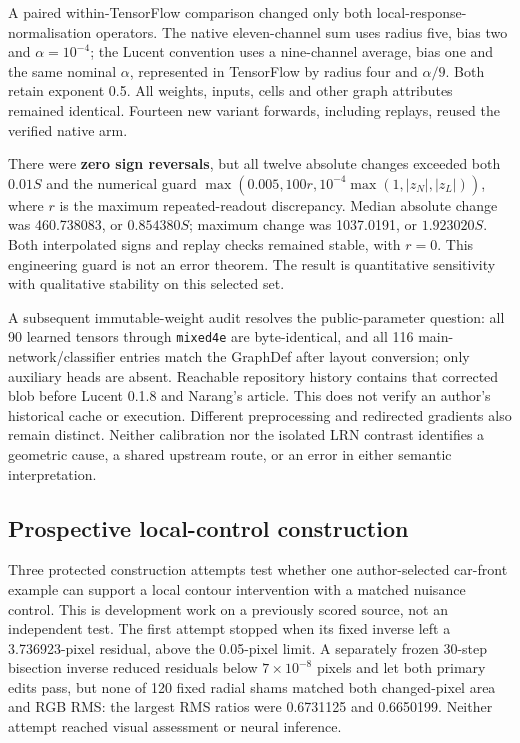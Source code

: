 \documentclass[
  british,
  11pt,
  a4paper,
]{article}
\newcounter{none} %
\begin{document}
A paired within-TensorFlow comparison changed only both
local-response-normalisation operators. The native eleven-channel sum
uses radius five, bias two and \(\alpha=10^{-4}\); the Lucent convention
uses a nine-channel average, bias one and the same nominal \(\alpha\),
represented in TensorFlow by radius four and \(\alpha/9\). Both retain
exponent 0.5. All weights, inputs, cells and other graph attributes
remained identical. Fourteen new variant forwards, including replays,
reused the verified native arm.

There were \textbf{zero sign reversals}, but all twelve absolute changes
exceeded both \(0.01S\) and the numerical guard
\(\max(0.005,100r,10^{-4}\max(1,|z_N|,|z_L|))\), where \(r\) is the
maximum repeated-readout discrepancy. Median absolute change was
460.738083, or \(0.854380S\); maximum change was 1037.0191, or
\(1.923020S\). Both interpolated signs and replay checks remained
stable, with \(r=0\). This engineering guard is not an error theorem.
The result is quantitative sensitivity with qualitative stability on
this selected set.

A subsequent immutable-weight audit resolves the public-parameter
question: all 90 learned tensors through \texttt{mixed4e} are
byte-identical, and all 116 main-network/classifier entries match the
GraphDef after layout conversion; only auxiliary heads are absent.
Reachable repository history contains that corrected blob before Lucent
0.1.8 and Narang's article. This does not verify an author's historical
cache or execution. Different preprocessing and redirected gradients
also remain distinct. Neither calibration nor the isolated LRN contrast
identifies a geometric cause, a shared upstream route, or an error in
either semantic interpretation.

\subsection{Prospective local-control
construction}\label{prospective-local-control-construction}

Three protected construction attempts test whether one author-selected
car-front example can support a local contour intervention with a
matched nuisance control. This is development work on a previously
scored source, not an independent test. The first attempt stopped when
its fixed inverse left a 3.736923-pixel residual, above the 0.05-pixel
limit. A separately frozen 30-step bisection inverse reduced residuals
below \(7\times10^{-8}\) pixels and let both primary edits pass, but
none of 120 fixed radial shams matched both changed-pixel area and RGB
RMS: the largest RMS ratios were 0.6731125 and 0.6650199. Neither
attempt reached visual assessment or neural inference.
\end{document}
